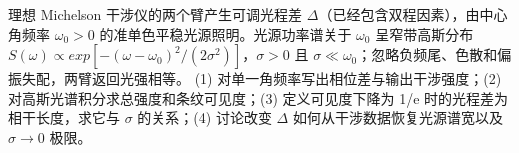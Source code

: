 理想 Michelson 干涉仪的两个臂产生可调光程差 \(\Delta \)（已经包含双程因素），由中心角频率 \(\omega _{0}>0\) 的准单色平稳光源照明。光源功率谱关于 \(\omega _{0}\) 呈窄带高斯分布 \(S(\omega )\propto exp[-(\omega -\omega _{0})^{2}/(2\sigma ^{2})]\)，\(\sigma >0\) 且 \(\sigma \ll \omega _{0}\)；忽略负频尾、色散和偏振失配，两臂返回光强相等。
(1) 对单一角频率写出相位差与输出干涉强度；(2) 对高斯光谱积分求总强度和条纹可见度；(3) 定义可见度下降为 1/e 时的光程差为相干长度，求它与 \(\sigma \) 的关系；(4) 讨论改变 \(\Delta \) 如何从干涉数据恢复光源谱宽以及 \(\sigma \to 0\) 极限。
